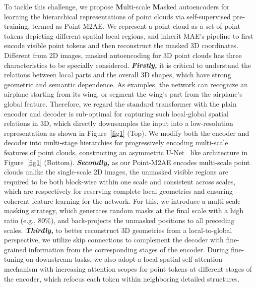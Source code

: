 \documentclass{article}
\begin{document}
To tackle this challenge, we propose \textbf{M}ulti-scale \textbf{M}asked autoencoders for learning the hierarchical representations of point clouds via self-supervised pre-training, termed as Point-M2AE. We represent a point cloud as a set of point tokens depicting different spatial local regions, and inherit MAE's pipeline to first encode visible point tokens and then reconstruct the masked 3D coordinates. 
Different from 2D images, masked autoencoding for 3D point clouds has three characteristics to be specially considered. 
\textit{\textbf{Firstly,}} it is critical to understand the relations between local parts and the overall 3D shapes, which have strong geometric and semantic dependence. As examples, the network can recognize an airplane starting from its wing, or segment the wing's part from the airplane's global feature. Therefore, we regard the standard transformer with the plain encoder and decoder is sub-optimal for capturing such local-global spatial relations in 3D, which directly downsamples the input into a low-resolution representation as shown in Figure~\ref{fig1} (Top). We modify both the encoder and decoder into multi-stage hierarchies for progressively encoding multi-scale features of point clouds, constructing an asymmetric U-Net~\cite{unet} like architecture in Figure~\ref{fig1} (Bottom). 
\textit{\textbf{Secondly,}} as our Point-M2AE encodes multi-scale point clouds unlike the single-scale 2D images, the unmasked visible regions are required to be both block-wise within one scale and consistent across scales, which are respectively for reserving complete local geometries and ensuring coherent feature learning for the network. For this, we introduce a multi-scale masking strategy, which generates random masks at the final scale with a high ratio (e.g., 80\%), and back-projects the unmasked positions to all preceding scales. \textit{\textbf{Thirdly,}} to better reconstruct 3D geometries from a local-to-global perspective, we utilize skip connections to complement the decoder with fine-grained information from the corresponding stages of the encoder.
During fine-tuning on downstream tasks, we also adopt a local spatial self-attention mechanism with increasing attention scopes for point tokens at different stages of the encoder, which refocus each token within neighboring detailed structures.
\end{document}
